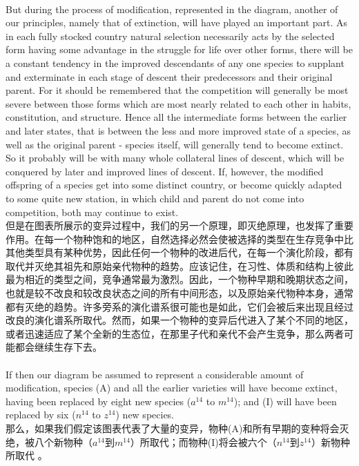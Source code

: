 \documentclass{article}
\begin{document}
\\
But during the process of modification, represented in the diagram, another of our principles, namely that of extinction, will have played an important part. As in each fully stocked country natural selection necessarily acts by the selected form having some advantage in the struggle for life over other forms, there will be a constant tendency in the improved descendants of any one species to supplant and exterminate in each stage of descent their predecessors and their original parent. For it should be remembered that the competition will generally be most severe between those forms which are most nearly related to each other in habits, constitution, and structure. Hence all the intermediate forms between the earlier and later states, that is between the less and more improved state of a species, as well as the original parent - species itself, will generally tend to become extinct. So it probably will be with many whole collateral lines of descent, which will be conquered by later and improved lines of descent. If, however, the modified offspring of a species get into some distinct country, or become quickly adapted to some quite new station, in which child and parent do not come into competition, both may continue to exist.\\
但是在图表所展示的变异过程中，我们的另一个原理，即灭绝原理，也发挥了重要作用。在每一个物种饱和的地区，自然选择必然会使被选择的类型在生存竞争中比其他类型具有某种优势，因此任何一个物种的改进后代，在每一个演化阶段，都有取代并灭绝其祖先和原始亲代物种的趋势。应该记住，在习性、体质和结构上彼此最为相近的类型之间，竞争通常最为激烈。因此，一个物种早期和晚期状态之间，也就是较不改良和较改良状态之间的所有中间形态，以及原始亲代物种本身，通常都有灭绝的趋势。许多旁系的演化谱系很可能也是如此，它们会被后来出现且经过改良的演化谱系所取代。然而，如果一个物种的变异后代进入了某个不同的地区，或者迅速适应了某个全新的生态位，在那里子代和亲代不会产生竞争，那么两者可能都会继续生存下去。\\ 

\\
If then our diagram be assumed to represent a considerable amount of modification, species (A) and all the earlier varieties will have become extinct, having been replaced by eight new species ($a^{14}$ to $m^{14}$); and (I) will have been replaced by six ($n^{14}$ to $z^{14}$) new species.\\
那么，如果我们假定该图表代表了大量的变异，物种(A)和所有早期的变种将会灭绝，被八个新物种（$a^{14}$到$m^{14}$）所取代；而物种(I)将会被六个（$n^{14}$到$z^{14}$）新物种所取代 。 \\
\end{document}
